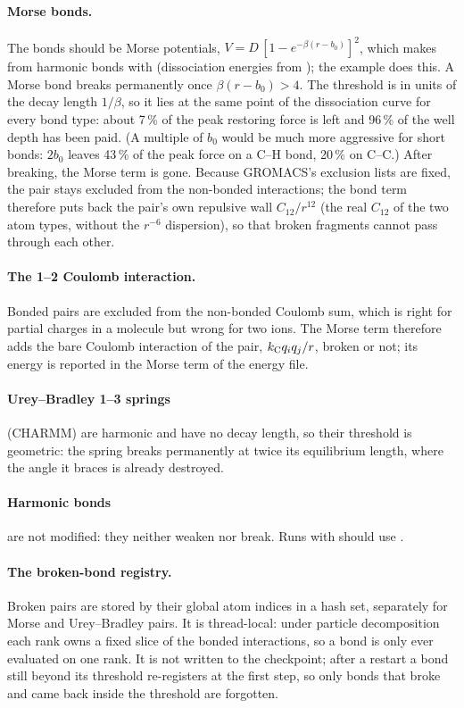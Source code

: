 \paragraph{Morse bonds.}
The bonds should be Morse potentials, $V = D\,[1-e^{-\beta(r-b_0)}]^2$, which  makes from harmonic bonds with
 (dissociation energies from ); the example does this.
A Morse bond breaks permanently once $\beta(r-b_0) > 4$.
The threshold is in units of the decay length $1/\beta$, so it lies at the same point of the dissociation curve for
every bond type: about 7\,\% of the peak restoring force is left and 96\,\% of the well depth has been paid.
(A multiple of $b_0$ would be much more aggressive for short bonds: $2b_0$ leaves 43\,\% of the peak force on a C--H bond,
20\,\% on C--C.)
After breaking, the Morse term is gone.
Because GROMACS's exclusion lists are fixed, the pair stays excluded from the non-bonded interactions; the bond term
therefore puts back the pair's own repulsive wall $C_{12}/r^{12}$ (the real $C_{12}$ of the two atom types, without the
$r^{-6}$ dispersion), so that broken fragments cannot pass through each other.

\paragraph{The 1--2 Coulomb interaction.}
Bonded pairs are excluded from the non-bonded Coulomb sum, which is right for partial charges in a molecule but wrong for
two ions.
The Morse term therefore adds the bare Coulomb interaction of the pair, $k_{\mathrm C} q_iq_j/r$, broken or not; its energy is
reported in the Morse term of the energy file.

\paragraph{Urey--Bradley 1--3 springs} (CHARMM) are harmonic and have no decay length, so their threshold is
geometric: the spring breaks permanently at twice its equilibrium length, where the angle it braces is already
destroyed.

\paragraph{Harmonic bonds} are not modified: they neither weaken nor break.
Runs with  should use .

\paragraph{The broken-bond registry.}
Broken pairs are stored by their global atom indices in a hash set, separately for Morse and Urey--Bradley pairs.
It is thread-local: under particle decomposition each rank owns a fixed slice of the bonded interactions, so a bond
is only ever evaluated on one rank.
It is not written to the checkpoint; after a restart a bond still beyond its threshold re-registers at the first
step, so only bonds that broke and came back inside the threshold are forgotten.

